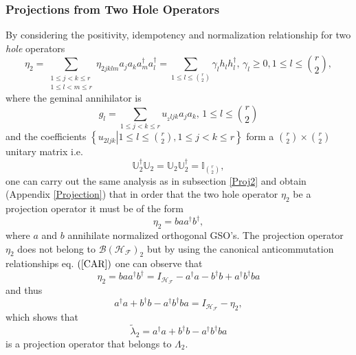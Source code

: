 \documentclass[aps,preprint]{revtex4}%
\begin{document}
\subsubsection{Projections from Two Hole Operators}

By considering the positivity, idempotency and normalization relationship for
two \emph{hole} operators
\begin{equation}
\eta_{2}=\sum_{\substack{1\leq j<k\leq r\\1\leq l<m\leq r}}\eta_{2jklm}%
a_{j}a_{k}a_{m}^{\dagger}a_{l}^{\dagger}=\sum_{1\leq l\leq\binom{r}{2}}%
\gamma_{l}h_{l}h_{l}^{\dagger},\,\gamma_{l}\geq0,1\leq l\leq\binom{r}{2},
\end{equation}
where the geminal annihilator is
\begin{equation}
g_{l}=\sum_{1\leq j<k\leq r}u_{_{2}ljk}a_{j}a_{k},\,1\leq l\leq\binom{r}{2}%
\end{equation}
and the coefficients $\left\{  \left.  u_{2ljk}\right\vert 1\leq l\leq
\binom{r}{2},1\leq j<k\leq r\right\}  $ form a $\binom{r}{2}\times\binom{r}%
{2}$ unitary matrix i.e.
\begin{equation}
\mathbb{U}_{2}^{\dagger}\mathbb{U}_{2}=\mathbb{U}_{2}\mathbb{U}_{2}^{\dagger
}=\mathbb{I}_{\binom{r}{2}},
\end{equation}
one can carry out the same analysis as in subsection \ref{Proj2} and obtain
(Appendix \ref{Projection}) that in order that the two hole operator $\eta
_{2}$ be a projection operator it must be of the form
\begin{equation}
\eta_{2}=baa^{\dagger}b^{\dagger},
\end{equation}
where $a$ and $b$ annihilate normalized orthogonal GSO's. The projection
operator $\eta_{2}$ does not belong to $\mathcal{B}\left(  \mathcal{H}%
_{\mathcal{F}}\right)  _{2}$ but by using the canonical anticommutation
relationships eq. $\left(  \ref{CAR}\right)  $ one can observe that
\begin{equation}
\eta_{2}=baa^{\dagger}b^{\dagger}=I_{\mathcal{H}_{\mathcal{F}}}-a^{\dagger
}a-b^{\dagger}b+a^{\dagger}b^{\dagger}ba
\end{equation}
and thus
\begin{equation}
a^{\dagger}a+b^{\dagger}b-a^{\dagger}b^{\dagger}ba=I_{\mathcal{H}%
_{\mathcal{F}}}-\eta_{2},
\end{equation}
which shows that
\begin{equation}
\tilde{\lambda}_{2}=a^{\dagger}a+b^{\dagger}b-a^{\dagger}b^{\dagger}ba
\end{equation}
is a projection operator that belongs to $\Lambda_{2}.$
\end{document}
